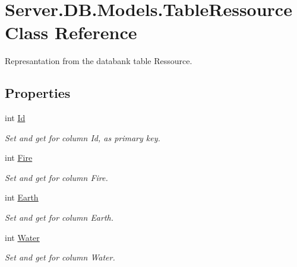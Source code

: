 \hypertarget{classServer_1_1DB_1_1Models_1_1TableRessource}{\section{Server.\-D\-B.\-Models.\-Table\-Ressource Class Reference}
\label{classServer_1_1DB_1_1Models_1_1TableRessource}
}


Represantation from the databank table Ressource.  


\subsection*{Properties}
\begin{DoxyCompactItemize}
\item 
int \hyperlink{classServer_1_1DB_1_1Models_1_1TableRessource_a3109dbf5907383a8f3184a8709c41e8f}{Id}
\begin{DoxyCompactList}\small\item\em Set and get for column Id, as primary key. \end{DoxyCompactList}\item 
int \hyperlink{classServer_1_1DB_1_1Models_1_1TableRessource_a2d29ff98fb11fa73de8d1ffcf7c5e689}{Fire}
\begin{DoxyCompactList}\small\item\em Set and get for column Fire. \end{DoxyCompactList}\item 
int \hyperlink{classServer_1_1DB_1_1Models_1_1TableRessource_a28f20f3d468730ffaa1fe87c34b5eb34}{Earth}
\begin{DoxyCompactList}\small\item\em Set and get for column Earth. \end{DoxyCompactList}\item 
int \hyperlink{classServer_1_1DB_1_1Models_1_1TableRessource_ac1fa0d3ffbbff65d4f557d99030e5bba}{Water}
\begin{DoxyCompactList}\small\item\em Set and get for column Water. \end{DoxyCompactList}\item 

\end{DoxyCompactItemize}

